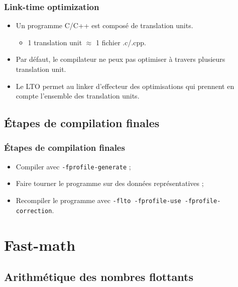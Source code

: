 \documentclass{beamer}
\begin{document}
\begin{frame}
    \frametitle{Link-time optimization}

    \begin{itemize}
        \item Un programme C/C++ est composé de translation units.
              \begin{itemize}
                  \item 1 translation unit $ \approx $ 1 fichier .c/.cpp.
              \end{itemize}
        \item Par défaut, le compilateur ne peux pas optimiser à travers plusieurs translation unit.
        \item Le LTO permet au linker d'effecteur des optimisations qui prennent en compte l'ensemble des translation units.
    \end{itemize}
\end{frame}

\subsection{Étapes de compilation finales}

\begin{frame}[fragile]
    \frametitle{Étapes de compilation finales}

    \begin{itemize}
        \item Compiler avec \verb'-fprofile-generate' ;
        \item Faire tourner le programme sur des données représentatives ;
        \item Recompiler le programme avec \verb'-flto -fprofile-use -fprofile-correction'.
    \end{itemize}
\end{frame}

\section{Fast-math}

\begin{frame}
    \tableofcontents[currentsection]
\end{frame}

\subsection{Arithmétique des nombres flottants}
\end{document}
